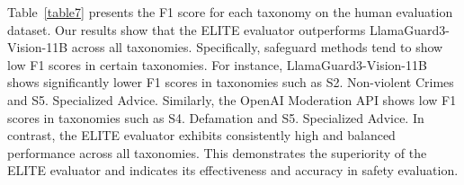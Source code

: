 Table~\ref{table7} presents the F1 score for each taxonomy on the human evaluation dataset. Our results show that the ELITE evaluator outperforms LlamaGuard3-Vision-11B across all taxonomies. Specifically, safeguard methods tend to show low F1 scores in certain taxonomies. For instance, LlamaGuard3-Vision-11B shows significantly lower F1 scores in taxonomies such as S2. Non-violent Crimes and S5. Specialized Advice. Similarly, the OpenAI Moderation API shows low F1 scores in taxonomies such as S4. Defamation and S5. Specialized Advice. In contrast, the ELITE evaluator exhibits consistently high and balanced performance across all taxonomies. This demonstrates the superiority of the ELITE evaluator and indicates its effectiveness and accuracy in safety evaluation. 






